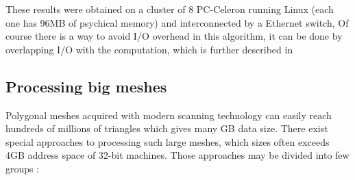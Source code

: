 These results were obtained on a cluster of 8 PC-Celeron running Linux (each one has 96MB of psychical memory) and interconnected by a Ethernet switch,
Of course there is a way to avoid I/O overhead in this algorithm, it can be done by overlapping I/O with the computation, which is further described in \cite{matinv}
\bigskip

\subsection{Processing big meshes}

Polygonal meshes acquired with modern scanning technology can easily reach hundreds of millions of triangles which gives many GB data size.
There exist special approaches to processing such large meshes, which sizes often exceeds 4GB address space of 32-bit machines.
Those approaches may be divided into few groups \cite{mesh}:
\bigskip

